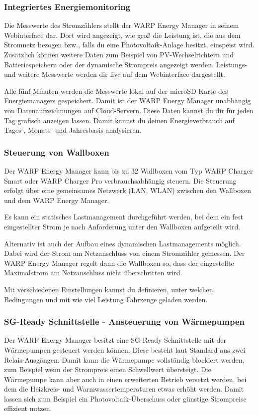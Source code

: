 \documentclass[a4paper,10pt]{article}
\begin{document}
\begin{multicols*}{2}
	\subsubsection{Integriertes Energiemonitoring}
	Die Messwerte des Stromzählers stellt der WARP Energy Manager in seinem
	Webinterface dar. Dort wird angezeigt, wie groß die Leistung ist, die aus dem Stromnetz
	bezogen bzw., falls du eine Photovoltaik-Anlage besitzt, einspeist wird. Zusätzlich können
    weitere Daten zum Beispiel von PV-Wechselrichtern und Batteriespeichern oder der dynamische Strompreis
    angezeigt werden. Leistungs- und weitere Messwerte werden dir live auf dem Webinterface dargestellt.

	Alle fünf Minuten werden die Messwerte lokal auf der microSD-Karte des
	Energiemanagers gespeichert. Damit ist der WARP Energy Manager unabhängig
	von Datenaufzeichnungen auf Cloud-Servern. Diese Daten kannst du dir für jeden Tag
	grafisch anzeigen lassen. Damit kannst du deinen Energieverbrauch auf Tages-, Monats- und
	Jahresbasis analysieren.

	\subsubsection{Steuerung von Wallboxen}
	Der WARP Energy Manager kann bis zu 32 Wallboxen vom Typ WARP Charger Smart oder WARP Charger Pro verbrauchsabhängig steuern.
	Die Steuerung erfolgt über eine gemeinsames Netzwerk (LAN, WLAN) zwischen den Wallboxen und dem WARP Energy Manager.

    Es kann ein statisches Lastmanagement durchgeführt werden, bei dem ein fest eingestellter Strom je nach Anforderung
    unter den Wallboxen aufgeteilt wird. 
    
    Alternativ ist auch der Aufbau eines dynamischen Lastmanagements möglich. Dabei wird der Strom am Netzanschluss
    von einem Stromzähler gemessen. Der WARP Energy Manager regelt dann die Wallboxen so, dass der eingestellte Maximalstrom 
    am Netzanschluss nicht überschritten wird.

	Mit verschiedenen Einstellungen kannst du definieren, 
	unter welchen Bedingungen und mit wie viel Leistung Fahrzeuge geladen werden.

	\subsubsection{SG-Ready Schnittstelle - Ansteuerung von Wärmepumpen}
    Der WARP Energy Manager besitzt eine SG-Ready Schnittstelle mit der Wärmepumpen gesteuert werden können.
    Diese besteht laut Standard aus zwei Relais-Ausgängen. Damit kann die Wärmepumpe vollständig blockiert werden, 
    zum Beispiel wenn der Strompreis einen Schwellwert übersteigt. Die Wärmepumpe kann aber auch in einen erweiterten Betrieb
    versetzt werden, bei dem die Heizkreis- und Warmwassertemperaturen etwas erhöht werden. Damit lassen sich zum Beispiel
    ein Photovoltaik-Überschuss oder günstige Strompreise effizient nutzen.


\end{multicols*}
\end{document}
